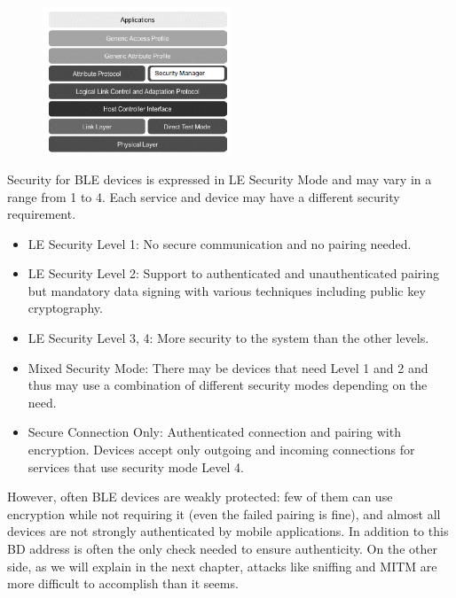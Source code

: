 \begin{figure}
	\centering	
	\includegraphics[width=0.5\textwidth]{architecture.gif}
	\label{fig:architecture}
\end{figure}

Security for BLE devices is expressed in LE Security Mode and may vary in a range from 1 to 4.
Each service and device may have a different security requirement.
\begin{itemize}
	\item LE Security Level 1: No secure communication and no pairing needed.
	\item LE Security Level 2: Support to authenticated and unauthenticated pairing but mandatory data signing with various techniques including public key cryptography.
	\item LE Security Level 3, 4: More security to the system than the other levels.
	\item Mixed Security Mode: There may be devices that need Level 1 and 2 and thus may use a combination of different security modes depending on the need.
	\item Secure Connection Only: Authenticated connection and pairing with encryption. Devices accept only outgoing and incoming connections for services that use security mode Level 4.
\end{itemize}

However, often BLE devices are weakly protected: few of them can use encryption while not requiring it (even the failed pairing is fine), and almost all devices are not strongly authenticated by mobile applications.
In addition to this BD address is often the only check needed to ensure authenticity. On the other side, as we will explain in the next chapter, attacks like sniffing and MITM are more difficult to accomplish than it seems.


